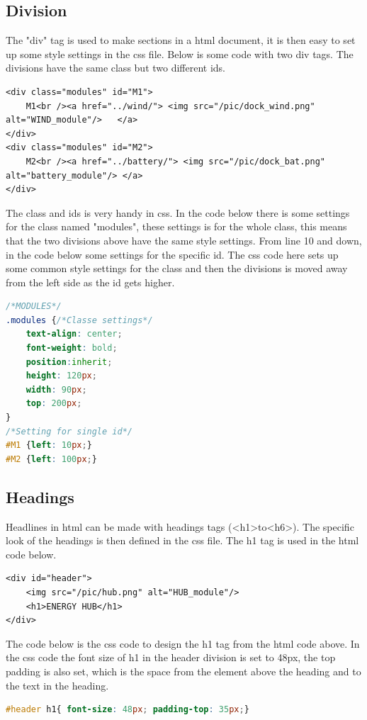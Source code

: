 \subsection{Division}
The "div" tag is used to make sections in a html document, it is then easy to set up some style settings in the css file. Below is some code with two div tags. The divisions have the same class but two different ids.
\begin{lstlisting}
<div class="modules" id="M1">		
	M1<br /><a href="../wind/"> <img src="/pic/dock_wind.png" alt="WIND_module"/> 	</a>
</div>
<div class="modules" id="M2">
	M2<br /><a href="../battery/"> <img src="/pic/dock_bat.png"  alt="battery_module"/>	</a>
</div>
\end{lstlisting}
The class and ids is very handy in css. In the code below there is some settings for the class named "modules", these settings is for the whole class, this means that the two divisions above have the same style settings. From line 10 and down, in the code below some settings for the specific id. The css code here sets up some common style settings for the class and then the divisions is moved away from the left side as the id gets higher.
\begin{lstlisting}[language=CSS]
/*MODULES*/
.modules {/*Classe settings*/
	text-align: center;
	font-weight: bold;
	position:inherit;
	height: 120px;
	width: 90px;
	top: 200px;
}
/*Setting for single id*/
#M1	{left: 10px;}
#M2	{left: 100px;}
\end{lstlisting}

\subsection{Headings}
Headlines in html can be made with headings tags (\textless h1\textgreater  to\textless h6\textgreater). The specific look of the headings is then defined in the css file. The h1 tag is used in the html code below.
\begin{lstlisting}
<div id="header">
	<img src="/pic/hub.png" alt="HUB_module"/>
	<h1>ENERGY HUB</h1>
</div>
\end{lstlisting}
The code below is the css code to design the h1 tag from the html code above. In the css code the font size of h1 in the header division is set to 48px, the top padding is also set, which is the space from the element above the heading and to the text in the heading.
\begin{lstlisting}[language=CSS]
#header h1{ font-size: 48px; padding-top: 35px;}
\end{lstlisting}

